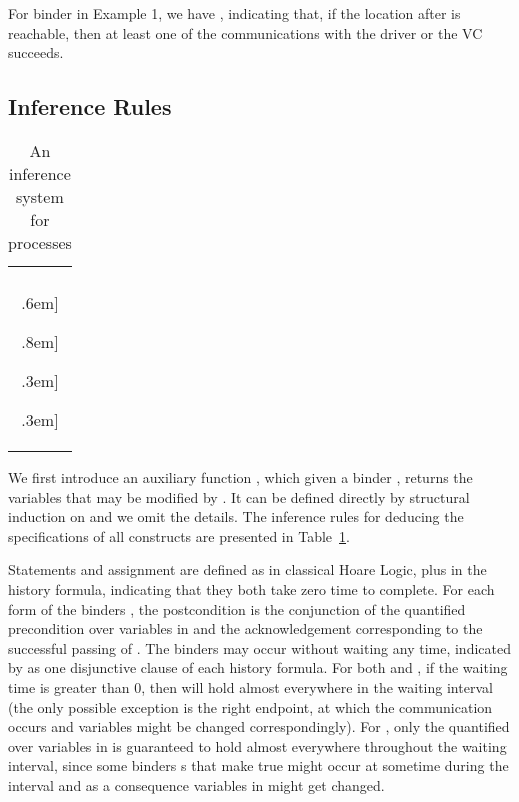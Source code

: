 \documentclass{llncs}
\begin{document}
\example
For binder  in Example 1, we have
,
indicating that, if the location after  is reachable, then at least one of the communications with the driver or the VC succeeds. 


\subsection{Inference Rules}

\begin{table}[t]
\small
\centering
\begin{tabular}{c}
\hline \\
 \0.6em]

\0.8em]

\1.3em]

\quad
 \1.3em]
\hline\\
\end{tabular}
\caption{An inference system for processes}
\label{inferencesystem}

\end{table}


We first introduce an auxiliary  function
, which given a binder , returns the variables that may be modified by . It can be defined directly  by structural induction on  and we omit the details.
The inference rules for deducing the
 specifications of all constructs are presented in Table~\ref{inferencesystem}.



Statements  and assignment are defined as in classical Hoare Logic, plus
 in the history formula, indicating that they both take zero time to complete.
For each form of the binders , the postcondition is the conjunction of
the quantified precondition  over variables in
 and  the acknowledgement corresponding to the successful
passing of . The binders  may occur without waiting any time,
indicated by  as one disjunctive clause of each history formula.
For both  and , if the waiting time is greater than
0, then   will hold almost everywhere in the waiting interval
 (the only possible exception is the right endpoint, at which the communication occurs and variables might be changed correspondingly). For
 ,  only the quantified   over  variables in
 is guaranteed to hold almost everywhere throughout the waiting interval, since
some binders s that make  true might occur at sometime during the interval
and as a consequence variables in  might get changed.
\end{document}
